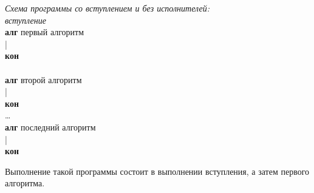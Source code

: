 \emph{Схема программы со вступлением и без исполнителей:}
{\sffamily\\
\textit{вступление}\\
\textbf{алг} первый алгоритм\\
|\\
\textbf{кон}\\
~\\
\textbf{алг} второй алгоритм\\
|\\
\textbf{кон}\\
\dots\\
\textbf{алг} последний алгоритм\\
|\\
\textbf{кон}
}

Выполнение такой программы состоит в выполнении вступления, а затем первого алгоритма.

